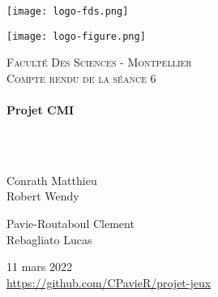 \documentclass[a4paper, 12pt]{article}
\begin{document}
\begin{titlepage}
  \begin{sffamily}
  \begin{center}
  

\begin{minipage}[c]{.46\linewidth}
     \begin{center}
             \texttt{[image: logo-fds.png]}
         \end{center}
   \end{minipage} \hfill
   \begin{minipage}[c]{.46\linewidth}
    \begin{center}
            \texttt{[image: logo-figure.png]}
        \end{center}
 \end{minipage}
    \newline \newline

    \textsc{\LARGE Faculté Des Sciences - Montpellier}\\[2cm]

    \textsc{\Large Compte rendu de la séance 6}\\[1.5cm]

    \HRule \\[0.4cm]
    { \huge \bfseries Projet CMI\\[0.4cm] }

    \HRule \\[2cm]
    \\[2cm]

    \begin{minipage}{0.4\textwidth}
      \begin{flushleft} \large
        Conrath Matthieu\\
        Robert Wendy\\
      \end{flushleft}
    \end{minipage}
    \begin{minipage}{0.4\textwidth}
      \begin{flushright} \large
       Pavie-Routaboul Clement\\
        Rebagliato Lucas\\
      \end{flushright}
    \end{minipage}

    \vfill
    {\large 11 mars 2022}
    \\
    {\url{https://github.com/CPavieR/projet-jeux}}

  \end{center}
  \end{sffamily}
\end{titlepage}
\end{document}
